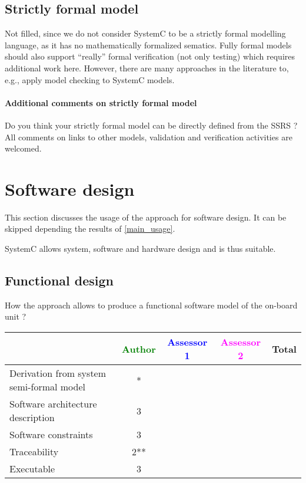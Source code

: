 \subsection{Strictly formal model}

\begin{author_comment}
Not filled, since we do not consider SystemC to be a strictly formal modelling language, as it has no mathematically formalized sematics. Fully formal models should also support ``really'' formal verification (not only testing) which requires additional work here. However, there are many approaches in the literature to, e.g., apply model checking to SystemC models.
\end{author_comment}


\paragraph{Additional comments on strictly formal model} Do you think your strictly formal model can be directly defined from the SSRS ?
All comments on links to other models, validation and verification activities are welcomed.


\section{Software design}
This section discusses the usage of the approach for software design.
It can be skipped depending the results of \ref{main_usage}.

\begin{author_comment}
SystemC allows system, software and hardware design and is thus suitable.
\end{author_comment}

\subsection{Functional design}

How the approach allows to produce a functional software model of the on-board unit ?

\begin{tabular}{|l | c | c | c | c|}
\hline
& \textcolor{green}{Author} & \textcolor{blue}{Assessor 1} & \textcolor{magenta}{Assessor 2} & Total \\
\hline
Derivation from system semi-formal model &* & & & \\
\hline
Software architecture description &3 & & & \\
\hline
Software constraints &3 & & & \\
\hline
Traceability &2** & & & \\
\hline
Executable &3 & & & \\
\hline
\end{tabular}

